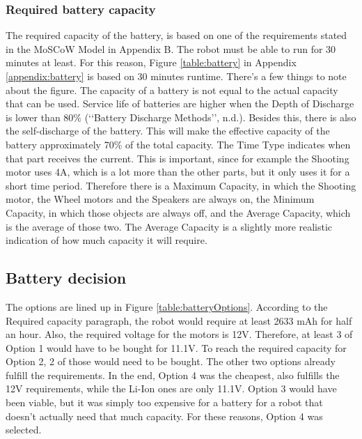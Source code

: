 \documentclass[11pt,twoside,a4paper]{report}
\begin{document}
\subsubsection{Required battery capacity}
The required capacity of the battery, is based on one of the requirements stated in the MoSCoW Model in Appendix B. The robot must be able to run for 30 minutes at least. For this reason, Figure \ref{table:battery} in Appendix \ref{appendix:battery} is based on 30 minutes runtime. 
There\rq{}s a few things to note about the figure. The capacity of a battery is not equal to the actual capacity that can be used. Service life of batteries are higher when the Depth of Discharge is lower than 80\% (\lq\lq{}Battery Discharge Methods\rq\rq{}, n.d.). Besides this, there is also the self-discharge of the battery. This will make the effective capacity of the battery approximately 70\% of the total capacity. 
The Time Type indicates when that part receives the current. This is important, since for example the Shooting motor uses 4A, which is a lot more than the other parts, but it only uses it for a short time period. Therefore there is a Maximum Capacity, in which the Shooting motor, the Wheel motors and the Speakers are always on, the Minimum Capacity, in which those objects are always off, and the Average Capacity, which is the average of those two. The Average Capacity is a slightly more realistic indication of how much capacity it will require. 

\subsection{Battery decision}
The options are lined up in Figure \ref{table:batteryOptions}. According to the Required capacity paragraph, the robot would require at least 2633 mAh for half an hour. Also, the required voltage for the motors is 12V. Therefore, at least 3 of Option 1 would have to be bought for 11.1V. To reach the required capacity for Option 2, 2 of those would need to be bought. The other two options already fulfill the requirements. 
In the end, Option 4 was the cheapest, also fulfills the 12V requirements, while the Li-Ion ones are only 11.1V. Option 3 would have been viable, but it was simply too expensive for a battery for a robot that doesn\rq{}t actually need that much capacity. 
For these reasons, Option 4 was selected. 
 \newpage
\end{document}
